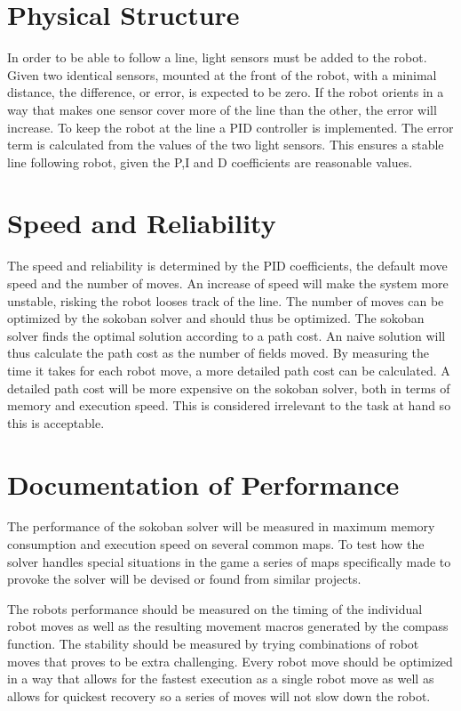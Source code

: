 \documentclass[a4paper,10pt]{article}
\begin{document}
\section{Physical Structure}
In order to be able to follow a line, light sensors must be added to the robot. 
Given two identical sensors, mounted at the front of the robot, with a minimal distance, the difference, or error, is expected to be zero.
If the robot orients in a way that makes one sensor cover more of the line than the other, the error will increase.
To keep the robot at the line a PID controller is implemented.
The error term is calculated from the values of the two light sensors.
This ensures a stable line following robot, given the P,I and D coefficients are reasonable values.

\section{Speed and Reliability}
The speed and reliability is determined by the PID coefficients, the default move speed and the number of moves.
An increase of speed will make the system more unstable, risking the robot looses track of the line.
The number of moves can be optimized by the sokoban solver and should thus be optimized.
The sokoban solver finds the optimal solution according to a path cost.
An naive solution will thus calculate the path cost as the number of fields moved.
By measuring the time it takes for each robot move, a more detailed path cost can be calculated.
A detailed path cost will be more expensive on the sokoban solver, both in terms of memory and execution speed.
This is considered irrelevant to the task at hand so this is acceptable.

\section{Documentation of Performance}
The performance of the sokoban solver will be measured in maximum memory consumption and execution speed on several common maps.
To test how the solver handles special situations in the game a series of maps specifically made to provoke the solver will be devised or found from similar projects.

The robots performance should be measured on the timing of the individual robot moves as well as the resulting movement macros generated by the compass function.
The stability should be measured by trying combinations of robot moves that proves to be extra challenging.
Every robot move should be optimized in a way that allows for the fastest execution as a single robot move as well as allows for quickest recovery so a series of moves will not slow down the robot.

\end{document}
